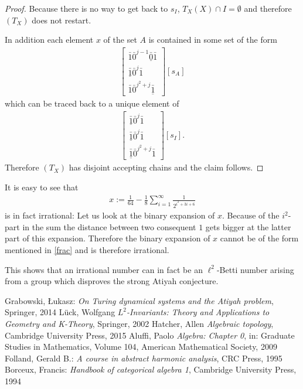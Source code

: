 \documentclass[12pt,a4paper]{scrartcl}
\theoremstyle{plain}
\theoremstyle{definition}
\newcommand{\2}{\mathbb{Z} / 2 \mathbb{Z}}
\newcommand{\1}{\bar{1}}
\newcommand{\0}{\bar{0}}
\begin{document}
\begin{proof}
	Because there is no way to get back to $s_I$, $T_X(X) \cap I = \emptyset$ and therefore $(T_X)$ does not restart.
	
	In addition each element $x$ of the set $A$ is contained in some set of the form
	\begin{align*}
		\begin{bmatrix}
			\1 \0^{j - 1} \underline{\0} \1 \\
			\underline{\1} \0^j \1 \\
			\1 \0^{j^2 + j} \underline{\1}
		\end{bmatrix}[s_A]
	\end{align*}
	which can be traced back to a unique element of 
	\begin{align*}
		\begin{bmatrix}
			\underline{\1} \0^j \1 \\
			\underline{\1} \0^j \1 \\
			\underline{\1} \0^{j^2 + j} \1
		\end{bmatrix}[s_I].
	\end{align*}
	Therefore $(T_X)$ has disjoint accepting chains and the claim follows.
\end{proof}

It is easy to see that
\begin{align*}
	x := \frac{1}{64} - \frac{1}{8} \sum_{i = 1}^{\infty} \frac{1}{2^{i^2 + 3i + 6}}
\end{align*}
is in fact irrational:
Let us look at the binary expansion of $x$. Because of the $i^2$-part in the sum the distance between two consequent $1$ gets bigger at the latter part of this expansion. Therefore the binary expansion of $x$ cannot be of the form mentioned in \ref{frac} and is therefore irrational.

This shows that an irrational number can in fact be an $\ell^2$-Betti number arising from a group which disproves the strong Atiyah conjecture.


  \newpage

\begin{thebibliography}{Lam00}
  Grabowski, \L ukasz: \emph{On Turing dynamical systems and the Atiyah problem}, Springer, 2014
  Lück, Wolfgang $L^2$\emph{-Invariants: Theory and Applications to Geometry and K-Theory}, Springer, 2002
  Hatcher, Allen \emph{Algebraic topology}, Cambridge University Press, 2015
  Aluffi, Paolo \emph{Algebra: Chapter 0}, in: Graduate Studies in Mathematics, Volume 104, American Mathematical Society, 2009
  Folland, Gerald B.: \emph{A course in abstract harmonic analysis}, CRC Press, 1995
  Borceux, Francis: \emph{Handbook of categorical algebra 1}, Cambridge University Press, 1994
\end{thebibliography}
 
\end{document}
